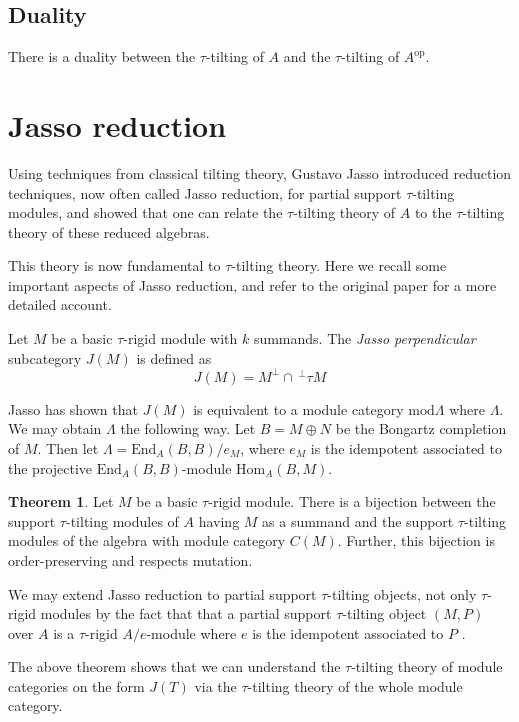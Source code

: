 \documentclass[]{article}
\theoremstyle{definition}
\newtheorem{theorem}{Theorem}[section]
\newcommand{\tu}{\ensuremath{\tau}}
\begin{document}
\subsection{Duality}
There is a duality between the \tu-tilting of $A$ and the \tu-tilting of $A^\text{op}$.

\section{Jasso reduction}
Using techniques from classical tilting theory, Gustavo Jasso\cite{jassoreduction} introduced reduction techniques, now often called Jasso reduction, for partial support \tu-tilting modules, and showed that one can relate the \tu-tilting theory of $A$ to the \tu-tilting theory of these reduced algebras.

This theory is now fundamental to \tu-tilting theory. Here we recall some important aspects of Jasso reduction, and refer to the original paper for a more detailed account.

Let $M$ be a basic \tu-rigid module with $k$ summands. The \textit{Jasso perpendicular} subcategory $J(M)$ is defined as \[J(M) = M^\perp \cap \, ^{\perp}\tau M\]

Jasso has shown that $J(M)$ is equivalent to a module category $\text{mod} \Lambda$ where $\Lambda$. We may obtain $\Lambda$ the following way. Let $B = M \oplus N$ be the Bongartz completion of $M$. Then let $\Lambda = \text{End}_A(B,B)/e_M$, where $e_M$ is the idempotent associated to the projective $\text{End}_A(B,B)$-module $\text{Hom}_A(B,M)$.


\begin{theorem}\cite[Theorem 3.15]{jassoreduction}
	Let $M$ be a basic \tu-rigid module. There is a bijection between the support \tu-tilting modules of $A$ having $M$ as a summand and the support \tu-tilting modules of the algebra with module category $C(M)$. Further, this bijection is order-preserving and respects mutation.
\end{theorem}

We may extend Jasso reduction to partial support \tu-tilting objects, not only \tu-rigid modules by the fact that that a partial support \tu-tilting object $(M,P)$ over $A$ is a \tu-rigid $A/e$-module where $e$ is the idempotent associated to $P$ \cite{tau}.

The above theorem shows that we can understand the \tu-tilting theory of module categories on the form $J(T)$ via the \tu-tilting theory of the whole module category. 
\end{document}
